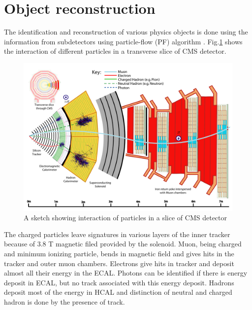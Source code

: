 \section{Object reconstruction}
The identification and reconstruction of various physics objects is done using the information from subdetectors using particle-flow (PF) 
algorithm \cite{CMS-PRF-14-001}. Fig.\ref{fig:CMS_PF} shows the interaction of different particles in a transverse slice of CMS detector.
\begin{figure}[h!]
\centering
\includegraphics[width=0.95\linewidth]{../Figures/Chap2/CMS_PF}
\caption[Particle interaction in CMS]{A sketch showing interaction of particles in a slice of CMS detector}
\label{fig:CMS_PF}
\end{figure}
The charged particles leave signatures in various layers of the inner tracker because of 3.8 T magnetic filed provided by the solenoid. 
Muon, being charged and minimum ionizing particle, bends in magnetic field and gives hits in the tracker and outer muon chambers. 
Electrons give hits in tracker and deposit almost all their energy in the ECAL. Photons can be identified if there is energy deposit in 
ECAL, but no track associated with this energy deposit. Hadrons deposit most of the energy in HCAL and distinction of neutral and charged 
hadron is done by the presence of track.

